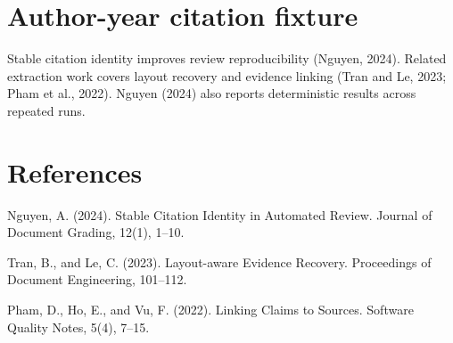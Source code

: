\documentclass[10pt]{article}
\begin{document}
\section*{Author-year citation fixture}

Stable citation identity improves review reproducibility (Nguyen, 2024).
Related extraction work covers layout recovery and evidence linking (Tran and Le, 2023; Pham et al., 2022).
Nguyen (2024) also reports deterministic results across repeated runs.

\section*{References}

Nguyen, A. (2024). Stable Citation Identity in Automated Review. Journal of Document Grading, 12(1), 1--10.

Tran, B., and Le, C. (2023). Layout-aware Evidence Recovery. Proceedings of Document Engineering, 101--112.

Pham, D., Ho, E., and Vu, F. (2022). Linking Claims to Sources. Software Quality Notes, 5(4), 7--15.
\end{document}
